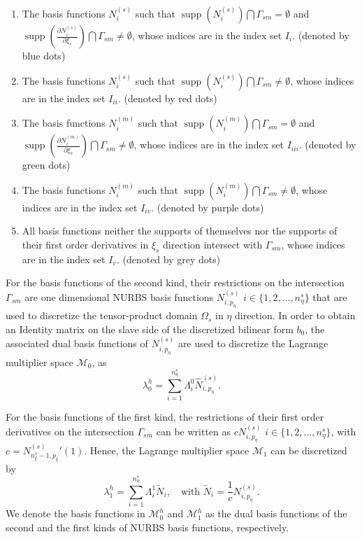 \documentclass[preprint,12pt]{elsarticle}
\newcommand{\supp}{\mathop{\mathrm{supp}}}
\begin{document}
\begin{enumerate}
    \item The basis functions $N^{(s)}_i$ such that $\supp(N^{(s)}_i)\bigcap\Gamma_{sm}=\emptyset$ and $\supp(\frac{\partial{}N^{(s)}_i}{\partial{\xi_s}})\bigcap\Gamma_{sm}\neq\emptyset$, whose indices are in the index set $I_i$. (denoted by blue dots)
    \item The basis functions $N^{(s)}_i$ such that $\supp(N^{(s)}_i)\bigcap\Gamma_{sm}\neq\emptyset$, whose indices are in the index set $I_{ii}$. (denoted by red dots)
    \item The basis functions $N^{(m)}_i$ such that $\supp(N^{(m)}_i)\bigcap\Gamma_{sm}=\emptyset$ and $\supp(\frac{\partial{}N^{(m)}_i}{\partial{\xi_s}})\bigcap\Gamma_{sm}\neq\emptyset$, whose indices are in the index set $I_{iii}$. (denoted by green dots)
    \item The basis functions $N^{(m)}_i$ such that $\supp(N^{(m)}_i)\bigcap\Gamma_{sm}\neq\emptyset$, whose indices are in the index set $I_{iv}$. (denoted by purple dots)
    \item All basis functions neither the supports of themselves nor the supports of their first order derivatives in $\xi_s$ direction intersect with $\Gamma_{sm}$, whose indices are in the index set $I_{v}$. (denoted by grey dots)
\end{enumerate}\par
For the basis functions of the second kind, their restrictions on the intersection $\Gamma_{sm}$ are one dimensional NURBS basis functions $N^{(s)}_{i,p_\eta}$ $i\in\{1,2,\dots,n_\eta^s\}$ that are used to discretize the tensor-product domain $\Omega_s$ in $\eta$ direction. In order to obtain an Identity matrix on the slave side of the discretized bilinear form $b_0$, the associated dual basis functions of $N^{(s)}_{i,p_\eta}$ are used to discretize the Lagrange multiplier space $\mathcal{M}_0$, as
\begin{equation}
    \lambda_0^h=\sum_{i=1}^{n_\eta^s}\Lambda_i^0\hat{N}^{(s)}_{i,p_\eta}.
\end{equation}\par
For the basis functions of the first kind, the restrictions of their first order derivatives on the intersection $\Gamma_{sm}$ can be written as $cN^{(s)}_{i,p_\eta}$ $i\in\{1,2,\dots,n_\eta^s\}$, with $c={N^{(s)}_{n_\xi^s-1,p_\xi}}'(1)$. Hence, the Lagrange multiplier space $\mathcal{M}_1$ can be discretized by
\begin{equation}
    \lambda_1^h=\sum_{i=1}^{n_\eta^s}\Lambda_i^1\tilde{N}_i,\quad \text{with } \tilde{N}_i=\frac{1}{c}N^{(s)}_{i,p_\eta}.
\end{equation}
We denote the basis functions in $\mathcal{M}_0^h$ and $\mathcal{M}_1^h$ as the dual basis functions of the second and the first kinds of NURBS basis functions, respectively. \par
\end{document}
